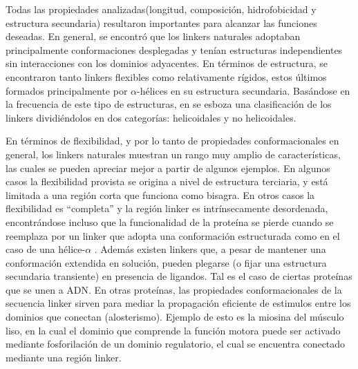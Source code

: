 Todas las propiedades analizadas(longitud, composición, hidrofobicidad y estructura secundaria) resultaron importantes para alcanzar las funciones deseadas.
En general, se encontró que los linkers naturales adoptaban principalmente conformaciones desplegadas y tenían estructuras independientes sin interacciones con los dominios adyacentes.
En términos de estructura, se encontraron tanto linkers flexibles como relativamente rígidos, estos últimos formados principalmente por $\alpha$-hélices en su estructura secundaria. 
Basándose en la frecuencia de este tipo de estructuras, en \cite{george2002analysis} se esboza una clasificación de los linkers dividiéndolos en dos categorías: helicoidales y no helicoidales.





En términos de flexibilidad, y por lo tanto de propiedades conformacionales en general, los linkers naturales muestran un rango muy amplio de características, las cuales se pueden apreciar mejor a partir de algunos ejemplos.
En algunos casos la flexibilidad provista se origina a nivel de estructura terciaria, y está limitada a una región corta que funciona como bisagra.%
En otros casos la flexibilidad es ``completa'' y la región linker es intrínsecamente desordenada\cite{luo2010flexibility}, 
encontrándose incluso que la funcionalidad de la proteína se pierde cuando se reemplaza por un linker que adopta una conformación estructurada como en el caso de una hélice-$\alpha$ \cite{hrycyna1998structural}.
Además existen linkers que, a pesar de mantener una conformación extendida en solución, pueden plegarse (o fijar una estructura secundaria transiente) en presencia de ligandos. Tal es el caso de ciertas proteínas que se unen a ADN\cite{laity2000dna}.
En otras proteínas, las propiedades conformacionales de la secuencia linker sirven para mediar la propagación eficiente de estimulos entre los dominios que conectan (alosterismo).%
Ejemplo de esto es la miosina del músculo liso, en la cual el dominio que comprende la función motora puede ser activado mediante fosforilación de un dominio regulatorio, 
el cual se encuentra conectado mediante una región linker\cite{ikebe1998hinge}.

